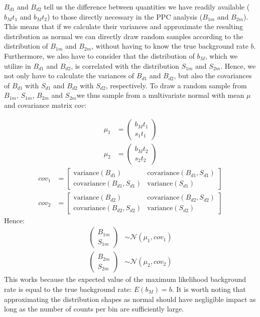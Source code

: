 \documentclass{report}
\begin{document}
$B_{d1}$ and $B_{d2}$ tell us the difference between quantities we have readily available ($b_Mt_1$ and $b_Mt_2$) to those directly necessary in the PPC analysis ($B_{1m}$ and $B_{2m}$). This means that if we calculate their variances and approximate the resulting distribution as normal we can directly draw random samples according to the distribution of $B_{1m}$ and $B_{2m}$, without having to know the true background rate $b$. Furthermore, we also have to consider that the distribution of $b_M$, which we utilize in $B_{d1}$ and $B_{d2}$, is correlated with the distribution $S_{1m}$ and $S_{2m}$. Hence, we not only have to calculate the variances of $B_{d1}$ and $B_{d2}$, but also the covariances of $B_{d1}$ with $S_{d1}$ and $B_{d2}$ with $S_{d2}$, respectively. To draw a random sample from $B_{1m}$, $S_{1m}$, $B_{2m}$ and $S_{2m}$we thus sample from a multivariate normal with mean $\mu$ and covariance matrix $cov$:

\begin{align}
    \mu_1 &= \begin{pmatrix}
        b_Mt_1 \\ s_1t_1
    \end{pmatrix} \\
    \mu_2 &= \begin{pmatrix}
      b_Mt_2 \\ s_2t_2
  \end{pmatrix} 
\end{align}
\begin{align} \label{eq: covs mats}
    cov_1 &= \begin{bmatrix}
        \text{variance}(B_{d1}) & \text{covariance}(B_{d1}, S_{d1})\\ \text{covariance}(B_{d1}, S_{d1}) & \text{variance}(S_{d1})
    \end{bmatrix} \\
    cov_2 &= \begin{bmatrix}
      \text{variance}(B_{d2}) & \text{covariance}(B_{d2}, S_{d2})\\ \text{covariance}(B_{d2}, S_{d2}) & \text{variance}(S_{d2})
  \end{bmatrix}
\end{align}
Hence: 
\begin{align} \label{eq mult var norm ppc}
    \begin{pmatrix}
        B_{1m} \\ S_{1m}
    \end{pmatrix}
    &\sim \mathcal{N}(\mu_1, cov_1)\\
    \begin{pmatrix}
      B_{2m} \\ S_{2m}
  \end{pmatrix}
  &\sim \mathcal{N}(\mu_2, cov_2)
\end{align}
This works because the expected value of the maximum likelihood background rate is equal to the true background rate: $E(b_M) = b$. It is worth noting that approximating the distribution shapes as normal should have negligible impact as long as the number of counts per bin are sufficiently large.
\end{document}

